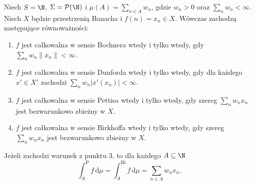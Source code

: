 \begin{twierdzenie}
\label{thm:atomic-four-integrals15b}
Niech $S=\N$, $\Sigma=\mathcal P(\N)$ i
$\mu(A)=\sum_{n\in A}w_n$, gdzie $w_n>0$ oraz
$\sum_n w_n<\infty$. Niech $X$ będzie przestrzenią Banacha
i $f(n)=x_n\in X$. Wówczas zachodzą następujące równoważności:
\begin{enumerate}
 \item $f$ jest całkowalna w sensie Bochnera wtedy i tylko wtedy,
 gdy $\sum_n w_n\|x_n\|<\infty$.
 \item $f$ jest całkowalna w sensie Dunforda wtedy i tylko wtedy,
 gdy dla każdego $x'\in X'$ zachodzi
 $\sum_n w_n|x'(x_n)|<\infty$.
 \item $f$ jest całkowalna w sensie Pettisa wtedy i tylko wtedy,
 gdy szereg $\sum_n w_n x_n$ jest bezwarunkowo zbieżny w $X$.
 \item $f$ jest całkowalna w sensie Birkhoffa wtedy i tylko wtedy,
 gdy szereg $\sum_n w_n x_n$ jest bezwarunkowo zbieżny w $X$.
\end{enumerate}
Jeżeli zachodzi warunek z punktu 3, to dla każdego $A\subseteq\N$
\[
 \int_A^{\mathrm P} f\,\mathrm d\mu
 =\int_A^{\mathrm{Bi}}f\,\mathrm d\mu
 =\sum_{n\in A}w_nx_n.
\]
\end{twierdzenie}
